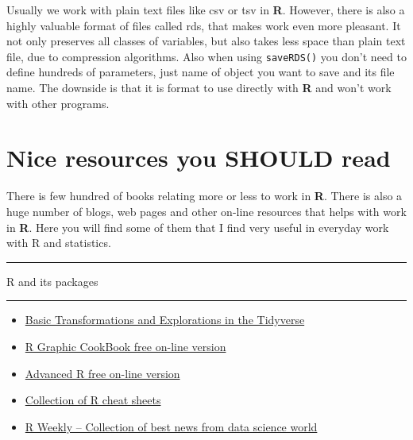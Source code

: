 \documentclass[]{book}
\providecommand{\tightlist}{%
  \setlength{\itemsep}{0pt}\setlength{\parskip}{0pt}}
\theoremstyle{definition}
\theoremstyle{definition}
\theoremstyle{definition}
\theoremstyle{remark}
\begin{document}
Usually we work with plain text files like csv or tsv in \textbf{R}.
However, there is also a highly valuable format of files called rds,
that makes work even more pleasant. It not only preserves all classes of
variables, but also takes less space than plain text file, due to
compression algorithms. Also when using \texttt{saveRDS()} you don't
need to define hundreds of parameters, just name of object you want to
save and its file name. The downside is that it is format to use
directly with \textbf{R} and won't work with other programs.

\section{Nice resources you SHOULD
read}\label{nice-resources-you-should-read}

There is few hundred of books relating more or less to work in
\textbf{R}. There is also a huge number of blogs, web pages and other
on-line resources that helps with work in \textbf{R}. Here you will find
some of them that I find very useful in everyday work with R and
statistics.

\begin{center}\rule{0.5\linewidth}{\linethickness}\end{center}

\begin{center}
\begingroup\Large
R and its packages  
\endgroup
\end{center}

\begin{center}\rule{0.5\linewidth}{\linethickness}\end{center}

\begin{itemize}
\tightlist
\item
  \href{https://annamarbut.blogspot.de/2018/02/basic-transformations-and-explorations.html}{Basic
  Transformations and Explorations in the Tidyverse}
\item
  \href{http://www.cookbook-r.com/Graphs/}{R Graphic CookBook free
  on-line version}
\item
  \href{https://adv-r.hadley.nz/}{Advanced R free on-line version}
\item
  \href{https://www.rstudio.com/resources/cheatsheets/}{Collection of R
  cheat sheets}
\item
  \href{https://rweekly.org}{R Weekly -- Collection of best news from
  data science world}
\end{itemize}
\end{document}
